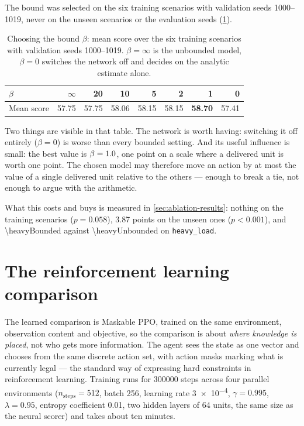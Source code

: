The bound was selected on the six training scenarios with validation seeds \numrange{1000}{1019},
never on the unseen scenarios or the evaluation seeds (\cref{tab:bound-sweep}).

\begin{table}[H]
    \centering
    \caption{Choosing the bound $\beta$: mean score over the six training scenarios with
             validation seeds \numrange{1000}{1019}. $\beta=\infty$ is the unbounded model,
             $\beta=0$ switches the network off and decides on the analytic estimate alone.}
    \label{tab:bound-sweep}
    \begin{tabular}{lrrrrrrr}
        \toprule
        $\beta$ & $\infty$ & 20 & 10 & 5 & 2 & \textbf{1} & 0\\
        \midrule
        Mean score & 57.75 & 57.75 & 58.06 & 58.15 & 58.15 & \textbf{58.70} & 57.41\\
        \bottomrule
    \end{tabular}
\end{table}

Two things are visible in that table. The network is worth having: switching it off entirely
($\beta=0$) is worse than every bounded setting. And its useful influence is small: the best value
is $\beta=1.0$, one point on a scale where a delivered unit is worth one point. The
chosen model may therefore move an action by at most the value of a single delivered unit relative
to the others --- enough to break a tie, not enough to argue with the arithmetic.

What this costs and buys is measured in \cref{sec:ablation-results}: nothing on the training
scenarios ($p=0.058$), \num{3.87} points on the unseen ones ($p<0.001$), and
\num{\heavyBounded} against \num{\heavyUnbounded} on \texttt{heavy\_load}.

\section{The reinforcement learning comparison}
\label{sec:ppo}

The learned comparison is Maskable PPO, trained on the same environment, observation content and
objective, so the comparison is about \emph{where knowledge is placed}, not who gets more
information. The agent sees the state as one vector and chooses from the same discrete action set,
with action masks marking what is currently legal --- the standard way of expressing hard
constraints in reinforcement learning. Training runs for \num{300000} steps across four parallel
environments ($n_{\text{steps}}=512$, batch \num{256}, learning rate \num{3e-4}, $\gamma=0.995$,
$\lambda=0.95$, entropy coefficient \num{0.01}, two hidden layers of \num{64} units, the same size
as the neural scorer) and takes about ten minutes.

